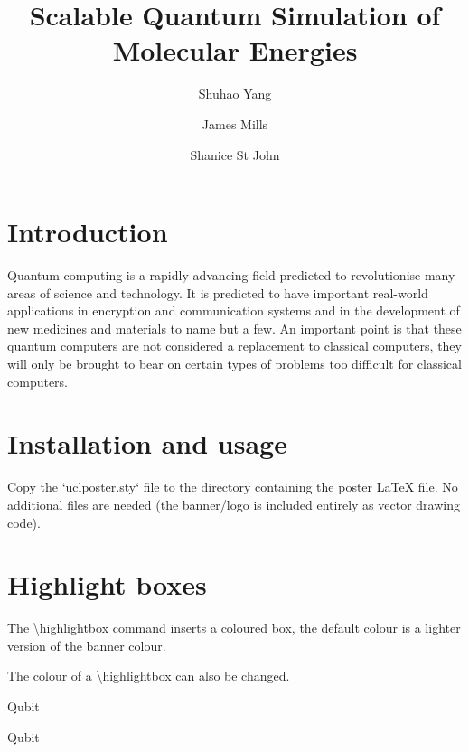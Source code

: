 \documentclass[landscape,color=UCLdarkred,margin=3cm]{uclposter}
\title{Scalable Quantum Simulation of Molecular Energies}
\author[1 *]{Shuhao Yang}
\author[1,2]{James Mills}
\author[1,2]{Shanice St John}
\affil[1]{Department of LaTeX Studies, UCL}
\affil[2]{TikZ, UCL}
\affil[*]{a.example@ucl.ac.uk}
\begin{document}
\maketitle

\begin{multicols}{3}

\section*{Introduction}
Quantum computing is a rapidly advancing field predicted to revolutionise many
areas of science and technology. It is predicted to have important real-world applications in encryption and communication systems and in the development of new medicines and materials to name but a few. An important point is that these quantum computers are not considered a replacement to classical computers, they will only be brought to bear on certain types of problems too difficult for classical computers.

\section*{Installation and usage}

Copy the `uclposter.sty` file to the directory containing the poster LaTeX file.
No additional files are needed (the banner/logo is included entirely as vector drawing code).

\section*{Highlight boxes}

\begin{highlightbox}
	The \textbackslash highlightbox command inserts a coloured box, the default colour is a lighter version of the banner colour.
\end{highlightbox}

\begin{highlightbox}
	The colour of a \textbackslash highlightbox can also be changed.
\end{highlightbox}

\begin{highlightbox}
	Qubit
\end{highlightbox}

\begin{highlightbox}
	Qubit
\end{highlightbox}


\end{multicols}
\end{document}
